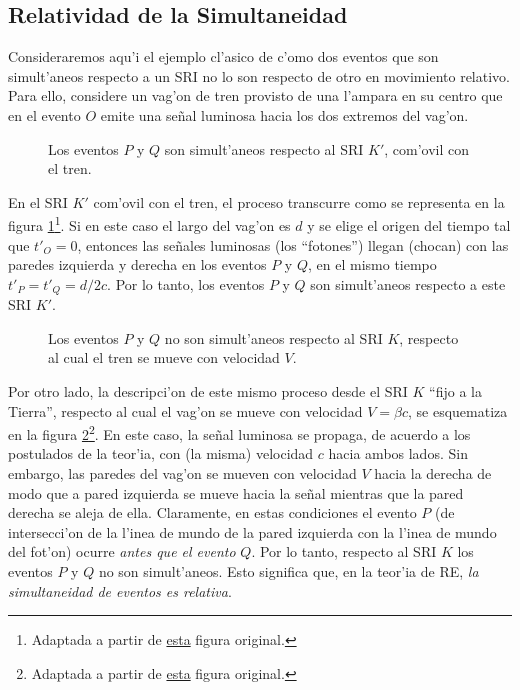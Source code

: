 \subsection{Relatividad de la Simultaneidad}
Consideraremos aqu'i el ejemplo cl'asico de c'omo dos eventos que son simult'aneos respecto a un SRI no lo son respecto de otro en movimiento relativo. Para ello, considere un vag'on de tren provisto de una l'ampara en su centro que en el evento $O$ emite una se\~nal luminosa hacia los dos extremos del vag'on.
\begin{figure}[H]
\centerline{}
\caption{Los eventos $P$ y $Q$ son simult'aneos respecto al SRI $K'$, com'ovil con el tren.}
\label{sim01}
\end{figure}
En el SRI $K'$ com'ovil con el tren, el proceso transcurre como se representa en la figura \ref{sim01}\footnote{Adaptada a partir de  \href{http://commons.wikimedia.org/wiki/File:Traincar_Relativity1.svg}{esta} figura original.}. Si en este caso el largo del vag'on es $d$ y se elige el origen del tiempo tal que $t'_O=0$, entonces las se\~nales luminosas (los ``fotones'') llegan (chocan) con las paredes izquierda y derecha en los eventos $P$ y $Q$, en el mismo tiempo $t'_P=t'_Q=d/2c$. Por lo tanto, los eventos $P$ y $Q$ son simult'aneos respecto a este SRI $K'$.
\begin{figure}[H]
\centerline{}
\caption{Los eventos $P$ y $Q$ no son simult'aneos respecto al SRI $K$, respecto al cual el tren se mueve con velocidad $V$.}
\label{sim02}
\end{figure}

Por otro lado, la descripci'on de este mismo proceso desde el SRI $K$ ``fijo a la Tierra'', respecto al cual el vag'on se mueve con velocidad $V=\beta c$, se esquematiza en la figura \ref{sim02}\footnote{Adaptada a partir de \href{http://commons.wikimedia.org/wiki/File:Traincar_Relativity2.svg}{esta} figura original.}. En este caso, la se\~nal luminosa se propaga, de acuerdo a los postulados de la teor'ia, con (la misma) velocidad $c$ hacia ambos lados. Sin embargo, las paredes del vag'on se mueven con velocidad $V$ hacia la derecha de modo que a pared izquierda se mueve hacia la se\~nal mientras que la pared derecha se aleja de ella. Claramente, en estas condiciones el evento $P$ (de intersecci'on de la l'inea de mundo de la pared izquierda con la l'inea de mundo del fot'on) ocurre \textit{antes que el evento} $Q$. Por lo tanto, respecto al SRI $K$ los eventos $P$ y $Q$ no son simult'aneos. Esto significa que, en la teor'ia de RE, \textit{la simultaneidad de eventos es relativa}.

